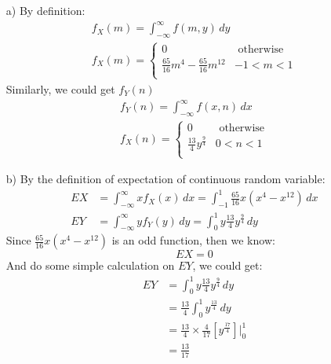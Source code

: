 \documentclass[hidelinks]{article}
\begin{document}
    \begin{enumerate}
        \item[a)] By definition:
        \begin{align*}
        f_{X}(m) = \int^\infty_{-\infty} f(m,y) \, dy \\
        f_X(m) = 
        \begin{cases}
        0    & \text{ otherwise}\\
        \frac{65}{16}m^4 - \frac{65}{16}m^{12} & -1 < m < 1 \\
        \end{cases}
        \end{align*}
        Similarly, we could get $f_Y(n)$
        \begin{align*}
        f_{Y}(n) = \int^\infty_{-\infty} f(x,n) \, dx \\
        f_{X}(n) = 
        \begin{cases}
        0 & \text{ otherwise}\\
        \frac{13}{4}y^{\frac{9}{4}}  & 0 < n < 1 \\
        \end{cases}
        \end{align*}
        \item[b)] By the definition of expectation of continuous random variable:
        \begin{align*}
            EX &= \int^{\infty}_{-\infty} xf_X(x)\, dx = \int^1_{-1} \frac{65}{16}x(x^4 - x^{12}) \, dx  \\
            EY &= \int^{\infty}_{-\infty} yf_Y(y)\, dy = \int^1_0 y\frac{13}{4}y^{\frac{9}{4}} \, dy
        \end{align*}
        Since $\frac{65}{16}x(x^4 - x^{12})$ is an odd function, then we know:
        $$ EX = 0$$
        And do some simple calculation on $EY$, we could get:
        \begin{align*}
            EY &= \int^1_0 y\frac{13}{4}y^{\frac{9}{4}} \, dy \\
               &= \frac{13}{4}\int^1_0 y^{\frac{13}{4}} \, dy \\
               &= \frac{13}{4} \times \frac{4}{17} [y^{\frac{17}{4}}]|^1_0 \\
               &= \frac{13}{17}
        \end{align*}
    \end{enumerate}
    
\end{document}
